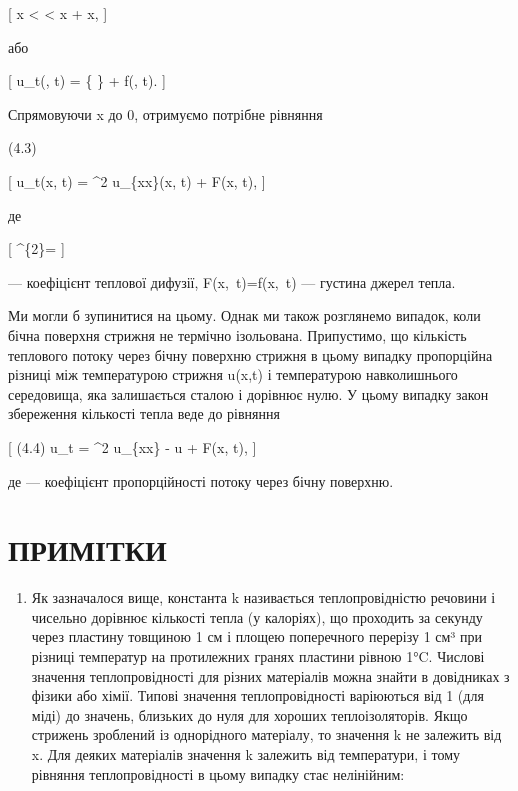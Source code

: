 \documentclass[
  ukrainian,
]{article}
\providecommand{\tightlist}{%
  \setlength{\itemsep}{0pt}\setlength{\parskip}{0pt}}
\begin{document}
{[} x \textless{} \xi \textless{} x + \Delta x, {]}

або

{[} u\_t(\xi, t) =  \left\{
 \right\} +
 f(\xi, t). {]}

Спрямовуючи \Delta x до 0, отримуємо потрібне рівняння

(4.3)

{[} u\_t(x, t) = \alpha\^{}2 u\_\{xx\}(x, t) + F(x, t), {]}

де

{[} \alpha\^{}\{2\}= {]}

--- коефіцієнт теплової дифузії,
F\left(x,~t\right)=f\left(x,~t\right) --- густина джерел
тепла.

Ми могли б зупинитися на цьому. Однак ми також розглянемо випадок, коли
бічна поверхня стрижня не термічно ізольована. Припустимо, що кількість
теплового потоку через бічну поверхню стрижня в цьому випадку
пропорційна різниці між температурою стрижня u(x,t) і температурою
навколишнього середовища, яка залишається сталою і дорівнює нулю. У
цьому випадку закон збереження кількості тепла веде до рівняння

{[} (4.4) u\_t = \alpha\^{}2 u\_\{xx\} - \beta u + F(x, t), {]}

де \beta --- коефіцієнт пропорційності потоку через бічну поверхню.

\section{ПРИМІТКИ}\label{ux43fux440ux438ux43cux456ux442ux43aux438}

\begin{enumerate}
\def\labelenumi{\arabic{enumi}.}
\tightlist
\item
  Як зазначалося вище, константа k називається теплопровідністю речовини
  і чисельно дорівнює кількості тепла (у калоріях), що проходить за
  секунду через пластину товщиною 1 см і площею поперечного перерізу 1
  см³ при різниці температур на протилежних гранях пластини рівною 1°C.
  Числові значення теплопровідності для різних матеріалів можна знайти в
  довідниках з фізики або хімії. Типові значення теплопровідності
  варіюються від 1 (для міді) до значень, близьких до нуля для хороших
  теплоізоляторів. Якщо стрижень зроблений із однорідного матеріалу, то
  значення k не залежить від x. Для деяких матеріалів значення k
  залежить від температури, і тому рівняння теплопровідності в цьому
  випадку стає нелінійним:
\end{enumerate}
\end{document}
